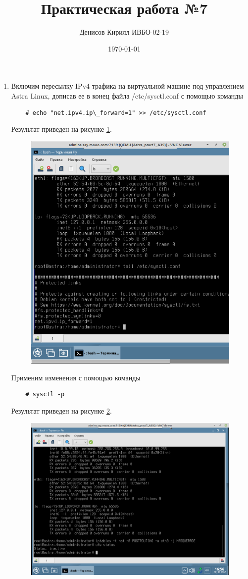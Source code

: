 \documentclass[a4paper,14pt]{extarticle}
\author{Денисов Кирилл ИВБО-02-19}
\title{Практическая работа №7}
\date{\today}
\begin{document}
	\maketitle
	
\begin{enumerate}
	\item Включим пересылку IPv4 трафика на виртуальной машине под управлением Astra Linux, дописав ее в конец файла /etc/sysctl.conf с помощью команды 
	
	\begin{lstlisting}
	# echo "net.ipv4.ip\_forward=1" >> /etc/sysctl.conf \end{lstlisting}
	
	Результат приведен на рисунке \ref{fig:---2022-03-30-16-54-58}.
\begin{figure}[h!]
	\centering
	\includegraphics[width=0.5\linewidth]{"images/Снимок экрана от 2022-03-30 16-54-58"}
	\caption{}
	\label{fig:---2022-03-30-16-54-58}
\end{figure}
	
	Применим изменения с помощью команды
	
	\begin{lstlisting}
	# sysctl -p \end{lstlisting}
	
	Результат приведен на рисунке \ref{fig:---2022-03-30-16-56-42}.
	
\begin{figure}[h!]
	\centering
	\includegraphics[width=0.5\linewidth]{"images/Снимок экрана от 2022-03-30 16-56-42"}
	\caption{}
	\label{fig:---2022-03-30-16-56-42}
\end{figure}


\end{enumerate}
\end{document}
